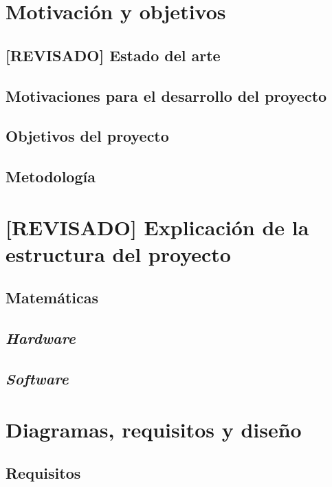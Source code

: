 \chapter{Motivación y objetivos}

\section{[REVISADO] Estado del arte}

\section{Motivaciones para el desarrollo del proyecto}

\section{Objetivos del proyecto}

\section{Metodología}


\chapter{[REVISADO] Explicación de la estructura del proyecto} 

\section{Matemáticas}

\section{\textit{Hardware}}

\section{\textit{Software}}


\chapter{Diagramas, requisitos y diseño}

\section{Requisitos}

